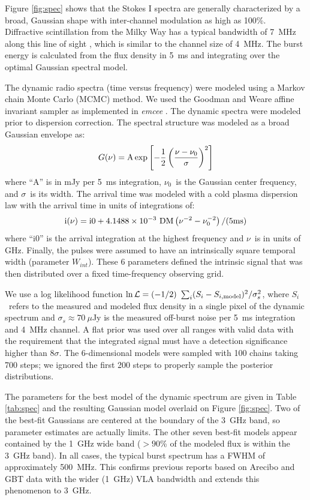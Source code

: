 \documentclass[twocolumn]{aastex61}
\begin{document}
Figure \ref{fig:spec} shows that the Stokes I spectra are generally characterized by a broad, Gaussian shape with inter-channel modulation as high as 100\%. Diffractive scintillation from the Milky Way has a typical bandwidth of 7~MHz along this line of sight \citep{2002astro.ph..7156C}, which is similar to the channel size of 4~MHz. The burst energy is calculated from the flux density in 5~ms and integrating over the optimal Gaussian spectral model.

The dynamic radio spectra (time versus frequency) were modeled using a Markov chain Monte Carlo (MCMC) method. We used the Goodman and Weare affine invariant sampler \citep{goodman2010ensemble} as implemented in \emph{emcee} \citep{2013PASP..125..306F}. The dynamic spectra were modeled prior to dispersion correction. The spectral structure was modeled as a broad Gaussian envelope as:
\begin{equation}
G(\nu) = \rm{A} \exp{\left[-\frac{1}{2} \left(\frac{\nu - \nu_0}{\sigma}\right)^2\right]}
\end{equation}
\noindent where ``A'' is in mJy per 5~ms integration, $\nu_0$\ is the Gaussian center frequency, and $\sigma$\ is its width. The arrival time was modeled with a cold plasma dispersion law with the arrival time in units of integrations of:
\begin{equation}
\rm{i} (\nu) = \rm{i0} + 4.1488\times10^{-3}\ \rm{DM} \left(\nu^{-2} - \nu_0^{-2}\right)/(5 \rm{ms})
\end{equation}
\noindent where ``i0'' is the arrival integration at the highest frequency and $\nu$\ is in units of GHz. Finally, the pulses were assumed to have an intrinsically square temporal width (parameter $W_{int}$). These 6 parameters defined the intrinsic signal that was then distributed over a fixed time-frequency observing grid.

We use a log likelihood function $\ln \mathcal{L}=(-1/2)\ \sum_i (S_i - S_{i, \rm{model}})^2/\sigma_s^2$, where $S_i$\ refers to the measured and modeled flux density in a single pixel of the dynamic spectrum and $\sigma_s\approx 70~\mu$Jy is the measured off-burst noise per 5~ms integration and 4~MHz channel. A flat prior was used over all ranges with valid data with the requirement that the integrated signal must have a detection significance higher than 8$\sigma$. The 6-dimensional models were sampled with 100 chains taking 700 steps; we ignored the first 200 steps to properly sample the posterior distributions. 

The parameters for the best model of the dynamic spectrum are given in Table \ref{tab:spec} and the resulting Gaussian model overlaid on Figure \ref{fig:spec}.  Two of the best-fit Gaussians are centered at the boundary of the 3~GHz band, so parameter estimates are actually limits. The other seven best-fit models appear contained by the 1~GHz wide band ($>90$\% of the modeled flux is within the 3~GHz band). In all cases, the typical burst spectrum has a FWHM of approximately 500~MHz. This confirms previous reports based on Arecibo and GBT data \citep{2016arXiv160308880S} with the wider (1~GHz) VLA bandwidth and extends this phenomenon to 3~GHz.
\end{document}
